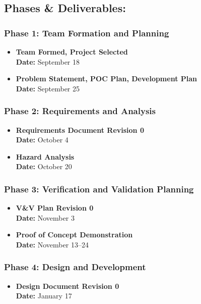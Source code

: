 \documentclass{article}
\begin{document}
\subsection*{Phases \& Deliverables:}
\subsubsection*{Phase 1: Team Formation and Planning}
\begin{itemize}
    \item \textbf{Team Formed, Project Selected} \\
    \textbf{Date:} September 18
    \item \textbf{Problem Statement, POC Plan, Development Plan} \\
    \textbf{Date:} September 25
\end{itemize}

\subsubsection*{Phase 2: Requirements and Analysis}
\begin{itemize}
    \item \textbf{Requirements Document Revision 0} \\
    \textbf{Date:} October 4
    \item \textbf{Hazard Analysis} \\
    \textbf{Date:} October 20
\end{itemize}

\subsubsection*{Phase 3: Verification and Validation Planning}
\begin{itemize}
    \item \textbf{V\&V Plan Revision 0} \\
    \textbf{Date:} November 3
    \item \textbf{Proof of Concept Demonstration} \\
    \textbf{Date:} November 13–24
\end{itemize}

\subsubsection*{Phase 4: Design and Development}
\begin{itemize}
    \item \textbf{Design Document Revision 0} \\
    \textbf{Date:} January 17
\end{itemize}
\end{document}
